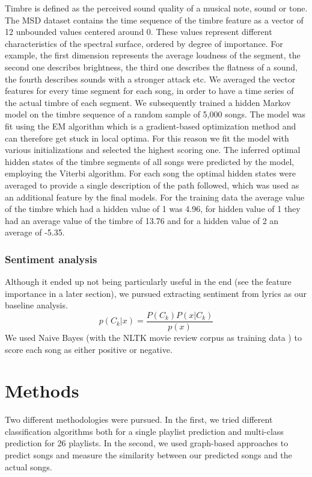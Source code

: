 \documentclass[acmtog]{acmart}
\begin{document}
Timbre is defined as the perceived sound quality of a musical note, sound or tone. The MSD dataset contains the time sequence of the timbre feature as a vector of 12 unbounded values centered around 0. These values represent different characteristics of the spectral
surface, ordered by degree of importance. For example, the first dimension represents the average
loudness of the segment, the second one describes brightness, the third one describes the flatness of a sound, the fourth describes sounds with a stronger attack etc. We averaged the vector features for every time segment for each song, in order to have a time series of the actual timbre of each segment.
We subsequently trained a hidden Markov model on the timbre sequence of a random sample of 5,000 songs. The model was fit using the EM algorithm which is a gradient-based optimization method and can therefore get stuck in local optima. For this reason we fit the model with various initializations and selected the highest scoring one.
The inferred optimal hidden states of the timbre segments of all songs were predicted by the model, employing the Viterbi algorithm.
For each song the optimal hidden states were averaged to provide a single description of the path followed, which was used as an additional feature by the final models.
For the training data the average value of the timbre which had a hidden value of 1 was 4.96, for hidden value of 1 they had an average value of the timbre of 13.76 and for a hidden value of 2 an average of -5.35.

\subsubsection{Sentiment analysis}

Although it ended up not being particularly useful in the end (see the feature importance in a later section), we pursued extracting sentiment from lyrics as our baseline analysis.
\[
  p(C_k | x) = \frac{P(C_k)P(x | C_k)}{p(x)}
\]
We used Naive Bayes (with the NLTK movie review corpus as training data \cite{nltk}) to score each song as either positive or negative.

\section{Methods}
\label{sec:sim}

Two different methodologies were pursued. In the first, we tried different classification algorithms both for a single playlist prediction and multi-class prediction for 26 playlists. In the second, we used graph-based approaches to predict songs and measure the similarity between our predicted songs and the actual songs.
\end{document}
